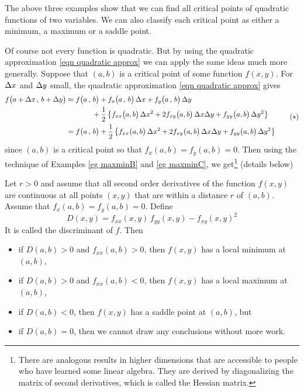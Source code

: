 The above three examples show that we can find all critical points
of quadratic functions of two variables. We can also classify 
each critical point as either a minimum, a maximum or a
saddle point. 

Of course not every function is quadratic. But by using the 
quadratic approximation \eqref{eqn quadratic approx}
we can apply the same ideas much more generally.
Suppose that $(a,b)$ is a critical point of some function $f(x,y)$. 
For $\Delta x$ and $\Delta y$ small, the
quadratic approximation \eqref{eqn quadratic approx} gives
\begin{equation*}
\begin{split}
f\big(a + \Delta x\,,\,b+\Delta y\big)
&\approx f\big(a\,,\,b\big) 
       + f_x\big(a\,,\,b\big)\,\Delta x
       + f_y\big(a\,,\,b\big)\,\Delta y \\
&\hskip0.5in +\frac{1}{2}\left\{
        f_{xx}\big(a,b\big)\,\Delta x^2
       +2f_{xy}\big(a,b\big) \,\Delta x\Delta y 
       + f_{yy}\big(a,b\big)\,\Delta y^2 \right\}\\
&= f\big(a\,,\,b\big) 
        +\frac{1}{2}\left\{
        f_{xx}\big(a,b\big)\,\Delta x^2
       +2f_{xy}\big(a,b\big) \,\Delta x\Delta y 
       + f_{yy}\big(a,b\big)\,\Delta y^2 \right\}
\end{split}\tag{$*$}
\end{equation*}
since $(a,b)$ is a critical point so that $f_x(a,b)=f_y(a,b)=0$.
Then using the technique of Examples \ref{eg maxminB} and \ref{eg maxminC}, 
we get\footnote{There are analogous results in higher dimensions that are accessible to people who have learned some linear algebra. They
are derived by diagonalizing the matrix of second derivatives, which is 
called the Hessian matrix.
} 
(details below)


\begin{theorem}\label{thm second deriv test}
Let $r>0$ and assume that all second order derivatives of the function 
$f(x,y)$ are continuous at all points $(x,y)$ that are within a distance
$r$ of $(a,b)$. Assume that $f_x(a,b)=f_y(a,b)=0$. 
Define
\begin{equation*}
D(x,y) = f_{xx}(x,y)\,f_{yy}(x,y) - f_{xy}(x,y)^2
\end{equation*}
It is called the discriminant of $f$. Then
\begin{itemize}
\item 
if $D(a,b)>0$ and $f_{xx}(a,b)>0$, then $f(x,y)$ has a local minimum 
at $(a,b)$, 
\item 
if $D(a,b)>0$ and $f_{xx}(a,b)<0$, then $f(x,y)$ has a local maximum 
at $(a,b)$, 
\item 
if $D(a,b)<0$, then $f(x,y)$ has a saddle point at $(a,b)$, but
\item 
if $D(a,b)=0$, then we cannot  draw any conclusions without more work.
\end{itemize}
\end{theorem}

